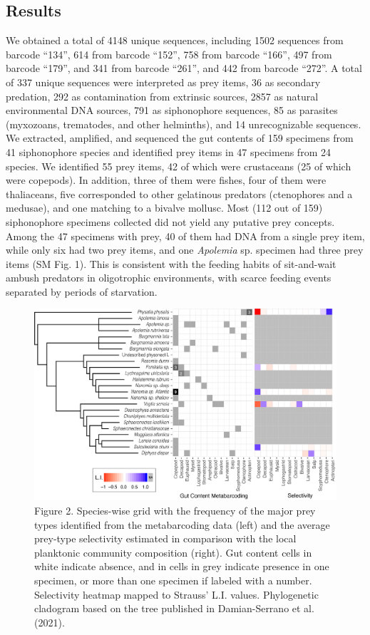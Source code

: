 \documentclass[12pt,]{article}
\begin{document}
\hypertarget{results}{%
\subsection*{Results}\label{results}}

We obtained a total of 4148 unique sequences, including 1502 sequences from barcode ``134'', 614 from barcode ``152'', 758 from barcode ``166'', 497 from barcode ``179'', and 341 from barcode ``261'', and 442 from barcode ``272''. A total of 337 unique sequences were interpreted as prey items, 36 as secondary predation, 292 as contamination from extrinsic sources, 2857 as natural environmental DNA sources, 791 as siphonophore sequences, 85 as parasites (myxozoans, trematodes, and other helminths), and 14 unrecognizable sequences.
We extracted, amplified, and sequenced the gut contents of 159 specimens from 41 siphonophore species and identified prey items in 47 specimens from 24 species. We identified 55 prey items, 42 of which were crustaceans (25 of which were copepods). In addition, three of them were fishes, four of them were thaliaceans, five corresponded to other gelatinous predators (ctenophores and a medusae), and one matching to a bivalve mollusc. Most (112 out of 159) siphonophore specimens collected did not yield any putative prey concepts. Among the 47 specimens with prey, 40 of them had DNA from a single prey item, while only six had two prey items, and one \emph{Apolemia} sp. specimen had three prey items (SM Fig. 1). This is consistent with the feeding habits of sit-and-wait ambush predators in oligotrophic environments, with scarce feeding events separated by periods of starvation.

\begin{figure}
\centering
\includegraphics{Figures/GC-SEL_spp.png}
\caption{\label{spp_gcsel} Figure 2. Species-wise grid with the frequency of the major prey types identified from the metabarcoding data (left) and the average prey-type selectivity estimated in comparison with the local planktonic community composition (right). Gut content cells in white indicate absence, and in cells in grey indicate presence in one specimen, or more than one specimen if labeled with a number. Selectivity heatmap mapped to Strauss' L.I. values. Phylogenetic cladogram based on the tree published in Damian-Serrano et al. (2021).}
\end{figure}
\end{document}
